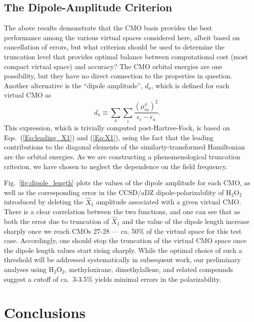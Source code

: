 \documentclass[journal=jpccck,manuscript=article]{achemso}
\begin{document}
\subsection{The Dipole-Amplitude Criterion}

The above results demonstrate that the CMO basis provides the best performance
among the various virtual spaces considered here, albeit based on cancellation
of errors, but what criterion should be used to determine the truncation level
that provides optimal balance between computational cost (most compact virtual
space) and accuracy?  The CMO orbital energies are one possibility, but they
have no direct connection to the properties in question.  Another alternative
is the ``dipole amplitude'', $d_a$, which is defined for each virtual CMO as
\begin{equation}
d_a \equiv \sum\limits_x\sum\limits_i\frac{({\mu^x_{ia}})^2}{\epsilon_i - \epsilon_a}.
\label{Eq:dipole}
\end{equation}
This expression, which is trivially computed post-Hartree-Fock, is based on
Eqs.~(\ref{Eq:leading_X1}) and (\ref{Eq:X1}), using the fact that the leading
contributions to the diagonal elements of the similarty-transformed
Hamiltonian are the orbital energies.    As we are constructing a
phenomenological truncation criterion, we have chosen to neglect the
dependence on the field frequency.

Fig.~\ref{fig:dipole_length} plots the values of the dipole amplitude for
each CMO, as well as the corresponding error in the CCSD/aDZ
dipole-polarizability of H$_2$O$_2$ introduced by deleting the $\hat{X}_1$
amplitude associated with a given virtual CMO. There is a clear correlation
between the two functions, and one can see that as both the error due to
truncation of $\hat{X}_1$ and the value of the dipole length increase sharply
once we reach CMOs 27-28 --- ca. 50\% of the virtual space for this test case.
Accordingly, one should stop the truncation of the virtual CMO space once the
dipole length values start rising sharply.  While the optimal choice of
such a threshold will be addressed systematically in subsequent work, our
preliminary analyses using H$_2$O$_2$, methyloxirane, dimethylallene, and
related compounds suggest a cutoff of ca.\ 3-3.5\% yields minimal errors
in the polarizability.

\section{Conclusions}
\end{document}
